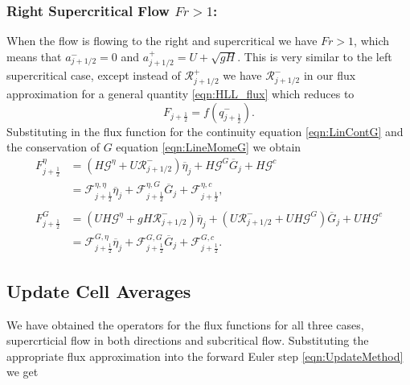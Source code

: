 \subsubsection{Right Supercritical Flow $Fr > 1$:}
When the flow is flowing to the right and supercritical we have $ Fr > 1 $, which means that $a^-_{j+ 1/2} = 0$ and $a^+_{j+ 1/2} =  U + \sqrt{g H}$. This is very similar to the left supercritical case, except instead of $\mathcal{R}^+_{j+1/2}$ we have $\mathcal{R}^-_{j+1/2}$ in our flux approximation for a general quantity \eqref{eqn:HLL_flux} which reduces to
\begin{equation}
F_{j+\frac{1}{2}} = f\left(q^-_{j+\frac{1}{2}}\right).
\label{eqn:fluxsupercritright}
\end{equation}
Substituting in the flux function for the continuity equation \eqref{eqn:LinContG} and the conservation of $G$ equation \eqref{eqn:LineMomeG} we obtain
\begin{align}
F^\eta_{j+\frac{1}{2}} &= \left(H \mathcal{G}^{\eta} + U \mathcal{R}^-_{j+1/2} \right)  \overline{\eta}_{j} + H \mathcal{G}^G \overline{G}_{j} + H\mathcal{G}^c \nonumber \\
&= \mathcal{F}^{\eta, \eta}_{j+\frac{1}{2}} \overline{\eta}_{j} + \mathcal{F}^{\eta, G}_{j+\frac{1}{2}} \overline{G}_{j} + \mathcal{F}^{\eta, c}_{j+\frac{1}{2}}, \\ \nonumber\\
F^G_{j+\frac{1}{2}}  &= \left(UH \mathcal{G}^{\eta} + gH \mathcal{R}^-_{j+1/2} \right)  \overline{\eta}_{j} + \left(U\mathcal{R}^-_{j+1/2} +  UH \mathcal{G}^G \right) \overline{G}_{j} + UH\mathcal{G}^c \nonumber \\
&= \mathcal{F}^{G, \eta}_{j+\frac{1}{2}} \overline{\eta}_{j} + \mathcal{F}^{G, G}_{j+\frac{1}{2}} \overline{G}_{j} + \mathcal{F}^{G, c}_{j+\frac{1}{2}}.
\label{eqn:FluxfactorsupercritGright}
\end{align}



\subsection{Update Cell Averages}
We have obtained the operators for the flux functions for all three cases, supercrticial flow in both directions and subcritical flow. Substituting the appropriate flux approximation into the forward Euler step \eqref{eqn:UpdateMethod} we get


